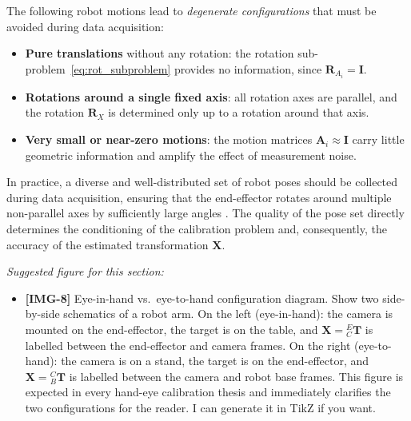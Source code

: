 The following robot motions lead to \textit{degenerate configurations} that
must be avoided during data acquisition:

\begin{itemize}
    \item \textbf{Pure translations} without any rotation: the rotation
    sub-problem~\eqref{eq:rot_subproblem} provides no information, since
    $\mathbf{R}_{A_i} = \mathbf{I}$.

    \item \textbf{Rotations around a single fixed axis}: all rotation axes are
    parallel, and the rotation $\mathbf{R}_X$ is determined only up to a rotation
    around that axis.

    \item \textbf{Very small or near-zero motions}: the motion matrices
    $\mathbf{A}_i \approx \mathbf{I}$ carry little geometric information and
    amplify the effect of measurement noise.
\end{itemize}

In practice, a diverse and well-distributed set of robot poses should be collected
during data acquisition, ensuring that the end-effector rotates around multiple
non-parallel axes by sufficiently large angles \cite{strobl2006optimal}. The
quality of the pose set directly determines the conditioning of the calibration
problem and, consequently, the accuracy of the estimated transformation
$\mathbf{X}$.

\bigskip
\noindent\textit{Suggested figure for this section:}
\begin{itemize}
    \item \textbf{[IMG-8]} Eye-in-hand vs.\ eye-to-hand configuration diagram.
    Show two side-by-side schematics of a robot arm. On the left (eye-in-hand):
    the camera is mounted on the end-effector, the target is on the table, and
    $\mathbf{X} = {}^E_C\mathbf{T}$ is labelled between the end-effector and
    camera frames. On the right (eye-to-hand): the camera is on a stand, the
    target is on the end-effector, and $\mathbf{X} = {}^C_B\mathbf{T}$ is
    labelled between the camera and robot base frames. This figure is expected
    in every hand-eye calibration thesis and immediately clarifies the two
    configurations for the reader. I can generate it in TikZ if you want.
\end{itemize}





